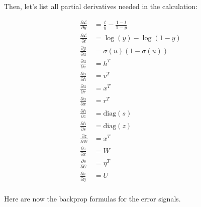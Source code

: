 \documentclass{article}
\begin{document}
\begin{enumerate}[(a)]
    Then, let's list all partial derivatives needed in the calculation:
    
    \begin{align*}
        \frac{\partial \mathcal{L}}{\partial y} &= \frac{t}{y} - \frac{1 - t}{1 - y}\\
        \frac{\partial \mathcal{L}}{\partial t} &= \log(y) - \log(1 - y)\\[1em]
        \frac{\partial y}{\partial u} &= \sigma(u) (1 - \sigma(u))\\[1em]
        \frac{\partial u}{\partial v} &= h^T\\
        \frac{\partial u}{\partial h} &= v^T\\
        \frac{\partial u}{\partial r} &= x^T\\
        \frac{\partial u}{\partial x} &= r^T\\[1em]
        \frac{\partial h}{\partial z} &= \text{diag}(s)\\
        \frac{\partial h}{\partial s} &= \text{diag}(z)\\[1em]
        \frac{\partial z}{\partial W} &= x^T\\
        \frac{\partial z}{\partial x} &= W \\[1em]
        \frac{\partial s}{\partial U} &= \eta^T \\
        \frac{\partial s}{\partial \eta} &= U \\[1em]
    \end{align*}
    
    Here are now the backprop formulas for the error signals.
    

\end{enumerate}
\end{document}
